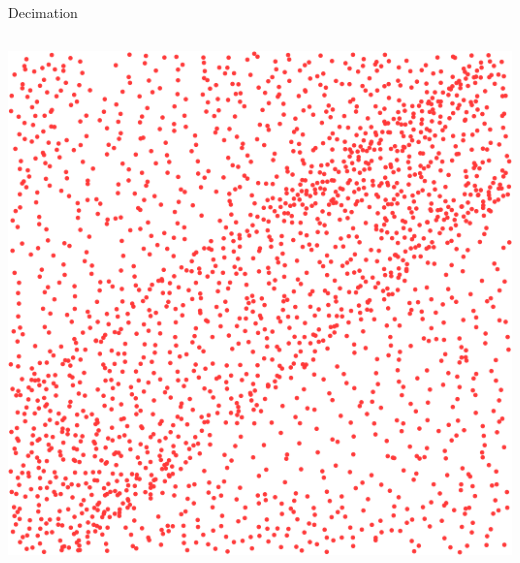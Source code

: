\documentclass[xcolor={dvipsnames,usenames},beamer,aspectratio=43]{beamer}
\begin{document}
\begin{frame}{Decimation}
\begin{columns}
\begin{column}{0.22\textwidth}
\begin{center}
\smallskip

\includegraphics[width=\textwidth]{features/preserve}

\end{center}

\end{column}
\end{columns}

\end{frame}
\end{document}
